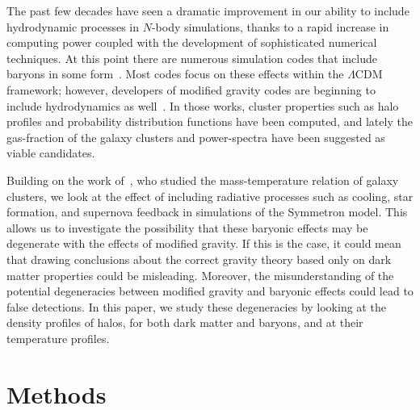 \documentclass{aa}
\begin{document}
The  past few decades have seen a dramatic improvement in our ability to include hydrodynamic processes in $N$-body simulations, thanks to a rapid increase in computing power coupled with the development of sophisticated numerical techniques. 
At this point there are numerous simulation codes that include baryons in some form~\citep{schaye2014eagle,enzo2005introducing,gadget2005cosmological,teyssier2002cosmological}. Most codes focus on these effects within the $\Lambda$CDM framework; however, developers of modified gravity codes are beginning to include hydrodynamics as well~\citep{puchwein2013modified,hammami2015cosmological,hammami2015hydrodynamic,arnold2014scaling}. In those works, cluster properties such as halo profiles and probability distribution functions have been computed, and lately the gas-fraction of the galaxy clusters and power-spectra have been suggested as viable candidates.

Building on the work of~\citet{hammami2017probing}, who studied the mass-temperature relation of galaxy clusters, we look at the effect of including radiative processes such as cooling, star formation, and supernova feedback in simulations of the Symmetron model.
This allows us to investigate the possibility that these baryonic effects may be degenerate with the effects of modified gravity. If this is the case, it could mean that drawing conclusions about the correct gravity theory based only on dark matter properties could be misleading. Moreover, the misunderstanding of the potential degeneracies between modified gravity and baryonic effects could lead to false detections. In this paper, we study these degeneracies by looking at the density profiles of halos, for both dark matter and baryons, and at their temperature profiles.
\section{Methods}
\end{document}
